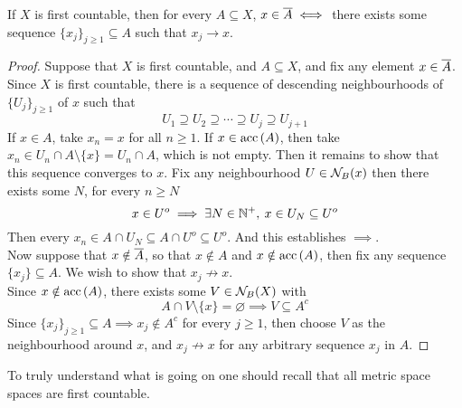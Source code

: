 \documentclass[../../main.tex]{subfiles}
\begin{document}
\begin{wts}
    If $X$ is first countable, then for every $A\subseteq X$, $x\in \overline{A}\iff$ there exists some sequence $\{x_j\}_{j\geq 1}\subseteq A$ such that $x_j\to x$.
\end{wts}
\begin{proof}
    Suppose that $X$ is first countable, and $A\subseteq X$, and fix any element $x\in\overline{A}$. Since $X$ is first countable, there is a sequence of descending neighbourhoods of $\{U_j\}_{j\geq 1}$ of $x$ such that
    \[
    U_1\supseteq U_2\supseteq \cdots\supseteq U_j\supseteq U_{j+1}
    \]
    If $x\in A$, take $x_n = x$ for all $n\geq 1$. If $x\in\operatorname{acc}{(A)}$, then take $x_n\in U_n\cap A\setminus \{x\}=U_n\cap A$, which is not empty. Then it remains to show that this sequence converges to $x$. Fix any neighbourhood $U\in\mathcal{N}_B({x})$ then there exists some $N$, for every $n\geq N$
    \[
    x\in U^o\implies \exists N\in\mathbb{N}^+, \: x\in U_N\subseteq U^o
    \]
    Then every $x_n\in A\cap U_N\subseteq A\cap U^o\subseteq U^o$. And this establishes $\implies$.\\
    
    Now suppose that $x\notin \overline{A}$, so that $x\notin A$ and $x\notin \operatorname{acc}{(A)}$, then fix any sequence $\{x_j\}\subseteq A$. We wish to show that $x_j\not\to x$.\\
    
    Since $x\notin \operatorname{acc}{(A)}$, there exists some $V\in\mathcal{N}_B({X})$ with
    \[
    A\cap V\setminus\{x\}=\varnothing\implies V\subseteq A^c
    \]
    Since $\{x_j\}_{j\geq 1}\subseteq A\implies x_j\notin A^c$ for every $j\geq 1$, then choose $V$ as the neighbourhood around $x$, and $x_j\not\to x$ for any arbitrary sequence $x_j$ in $A$.
\end{proof}
\begin{remark}
    To truly understand what is going on one should recall that all metric space spaces are first countable.
\end{remark} 
\end{document}
